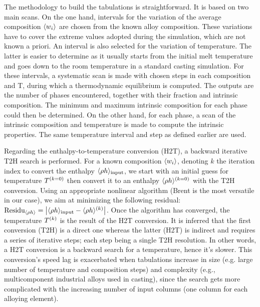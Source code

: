 %
The methodology to build the tabulations is straightforward. It is based on two main scans. On the one hand, intervals for the variation of the 
average composition $\langle w_i \rangle$ are chosen from the known alloy composition. These variations have to cover the extreme values adopted during the 
simulation, which are not known a priori. An interval is also selected for the variation of temperature. The latter is easier to determine as it
usually starts from the initial melt temperature and goes down to the room temperature in a standard casting simulation. For these intervals, a 
systematic scan is made with chosen steps in each composition and T, during which a thermodynamic equilibrium is computed. The outputs are the 
number of phases encountered, together with their fraction and intrinsic composition. The minimum and maximum intrinsic composition for each phase 
could then be determined. On the other hand, for each phase, a scan of the intrinsic composition and temperature is made to compute the intrinsic 
properties. The same temperature interval and step as defined earlier are used.

Regarding the enthalpy-to-temperature conversion (H2T), a backward iterative T2H search is performed. 
For a known composition $\langle w_i \rangle$, denoting $k$ the iteration index to convert the enthalpy 
$\langle \rho h \rangle_{\text{input}}$, we start with an initial guess for temperature $T^{\left( k=0 \right)}$ then convert it to an 
enthalpy  $\langle  \rho h  \rangle^{\left( k=0 \right)}$ with the T2H conversion. Using an appropriate nonlinear algorithm (Brent is the most versatile 
in our case), we aim at minimizing the following residual: $\text{Residu}_{\langle  \rho h  \rangle} = \left | \langle  \rho h  \rangle_{\text{input}} - \langle  \rho h  \rangle^{\left( k \right)}  \right |$. 
Once the algorithm has converged, the temperature $T^{\left( k \right)}$ is the result of the H2T conversion. It is 
inferred that the first conversion (T2H) is a direct one whereas the latter (H2T) is indirect and requires 
a series of iterative steps; each step being a single T2H resolution. In other words, a H2T conversion is a 
backward search for a temperature, hence it’s slower. This conversion’s speed lag is exacerbated when tabulations 
increase in size (e.g. large number of temperature and composition steps) and complexity (e.g., multicomponent 
industrial alloys used in casting), since the search gets more complicated with the increasing number of input 
columns (one column for each alloying element).
%
%
